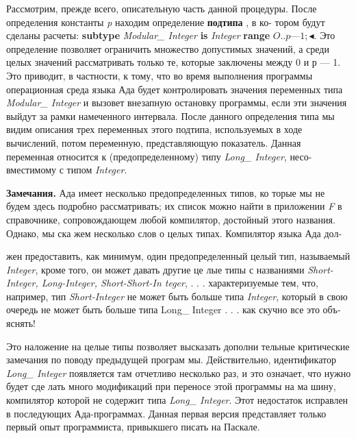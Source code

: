 Рассмотрим, прежде всего, описательную часть данной процедуры.\linebreak
После определения константы {\it p} находим определение {\bf подтипа} , в ко­-\linebreak
тором будут сделаны расчеты:  {\bf subtype} {\it Modular\_ Integer} {\bf is} {\it Integer} \linebreak
{\bf range} $O..p — 1;\blacktriangleleft$. 
Это определение позволяет ограничить множество\linebreak
допустимых значений, а среди целых значений рассматривать только\linebreak
те, которые заключены между 0 и р — 1. Это приводит, в частности, к\linebreak
тому, что во время выполнения программы операционная среда языка\linebreak
Ада будет контролировать значения переменных типа {\it Modular\_ Integer}\linebreak
и вызовет внезапную остановку программы, если эти значения выйдут\linebreak
за рамки намеченного интервала. После данного определения типа мы\linebreak
видим описания трех переменных этого подтипа, используемых в ходе\linebreak
вычислений, потом переменную, представляющую показатель. Данная\linebreak
переменная относится к (предопределенному) типу {\it Long\_ Integer}, несо-\linebreak
вместимому с типом {\it Integer}.

\begin{center}
\parbox{12cm} {
{\bf Замечания.} Ада имеет несколько предопределенных типов, ко­
торые мы не будем здесь подробно рассматривать; их список
можно найти в приложении {\it F} в справочнике, сопровождающем
любой компилятор, достойный этого названия. Однако, мы ска­
жем несколько слов о целых типах. Компилятор языка Ада дол-}
\end{center}
\newpage
\begin{center}
\parbox{12cm}{
жен предоставить, как минимум, один предопределенный целый
тип, называемый {\it Integer}, кроме того, он может давать другие це­
лые типы с названиями {\it Short-Integer, Long-Integer, Short-Short-In­
teger}, . . . характеризуемые тем, что, например, тип {\it Short-Integer}
не может быть больше типа {\it Integer}, который в свою очередь не
может быть больше типа {Long\_ Integer} . . . как скучно все это объ­
яснять!

Это наложение на целые типы позволяет высказать дополни­
тельные критические замечания по поводу предыдущей програм­
мы. Действительно, идентификатор {\it Long\_ Integer} появляется там
отчетливо несколько раз, и это означает, что нужно будет сде­
лать много модификаций при переносе этой программы на ма­
шину, компилятор которой не содержит типа {\it Long\_ Integer}. Этот
недостаток исправлен в последующих Ада-программах. Данная
первая версия представляет только первый опыт программиста,
привыкшего писать на Паскале.}
\end{center}

